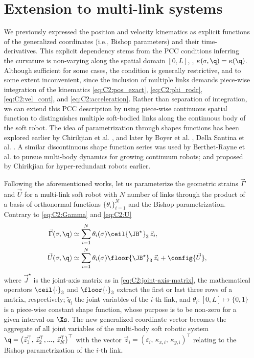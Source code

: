 \section{Extension to multi-link systems}
\label{sec: chap2 section header}
\noindent We previously expressed the position and velocity kinematics as explicit functions of the generalized coordinates (i.e., Bishop parameters) and their time-derivatives. This explicit dependency stems from the PCC conditions inferring the curvature is non-varying along the spatial domain $[0,L]$, \ie, $\kappa(\sigma,\q) = \kappa(\q)$. Although sufficient for some cases, the condition is generally restrictive, and to some extent inconvenient, since the inclusion of multiple links demands piece-wise integration of the kinematics \eqref{eq:C2:pos_exact}, \eqref{eq:C2:phi_rodr}, \eqref{eq:C2:vel_cont}, and \eqref{eq:C2:acceleration}. Rather than separation of integration, we can extend this PCC description by using piece-wise continuous spatial function to distinguishes multiple soft-bodied links along the continuous body of the soft robot. The idea of parametrization through shapes functions has been explored earlier by Chirikjian et al.
\cite{Chirikjian1994,Chirikjian1992}, and later by Boyer et al. \cite{Boyer2021}, Della Santina et al. \cite{DellaSantina2020}. A similar discontinuous shape function series was used by Berthet-Rayne et al. \cite{Berthet2021} to pursue multi-body dynamics for growing continuum robots; and proposed by Chirikjian \cite{Chirikjian1992} for hyper-redundant robots earlier.

Following the aforementioned works, let us parameterize the geometric strains $\vec{\Gamma}$ and $\vec{U}$ for  a multi-link soft robot with $N$ number of links  through the product of a basis of orthonormal functions $\!\{\theta_i\}_{i=1}^{N}$ and the Bishop parametrization. Contrary to \eqref{eq:C2:Gamma} and \eqref{eq:C2:U}
%
\begin{align} \vec{\Gamma}(\sigma,\q) & \simeq \sum^N_{i=1} \theta_i(\sigma) \ceil{\JB^\star}_3
\,\vec{z}_i, \label{eq:C2:theta_extent} \\ \vec{U}(\sigma,\q) & \simeq \sum^N_{i=1} \theta_i(\sigma)
\floor{\JB^\star}_3\,\vec{z}_i + \config{\vec{U}}, \label{eq:C2:h_extent} \end{align}
%
where $\vec{J}^\star$ is the joint-axis matrix as in \eqref{eq:C2:joint-axis-matrix}, the mathematical operators $\ceil{\cdot}_3$ and $\floor{\cdot}_3$  extract the first or last three rows of a matrix, respectively;  $\tilde{q}_i$ the joint variables of the $i$-th link, and $\theta_i: [0,L] \mapsto \{0,1\}$ is a piece-wise constant shape function, whose purpose is to be non-zero for a given interval on
$\Xs$.
The new generalized coordinate vector becomes the aggregate of all joint variables of the multi-body soft robotic system $\q =  \left(\vec{z}_1^\top,\,\vec{z}_2^\top,...,\,\vec{z}_N^\top \right)^\top$ with the vector $\vec{z}_i = (\varepsilon_{i},\, \kappa_{x,i},\,\kappa_{y,i})^\top$ relating to the Bishop parametrization of the $i$-th link.

